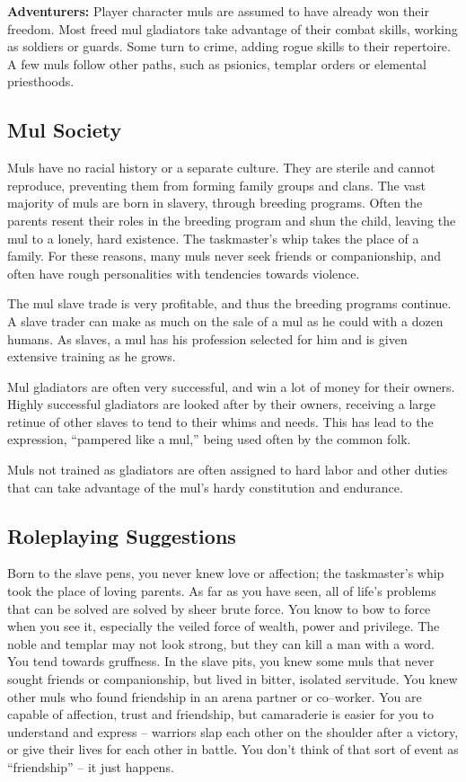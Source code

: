 \documentclass[10pt,a4paper,twocolumn]{d20}
\begin{document}
{\textbf{Adventurers:} Player character muls are assumed to have already won their freedom. Most freed mul gladiators take advantage of their combat skills, working as soldiers or guards. Some turn to crime, adding rogue skills to their repertoire. A few muls follow other paths, such as psionics, templar orders or elemental priesthoods.

\subsection{Mul Society}
Muls have no racial history or a separate culture. They are sterile and cannot reproduce, preventing them from forming family groups and clans. The vast majority of muls are born in slavery, through breeding programs. Often the parents resent their roles in the breeding program and shun the child, leaving the mul to a lonely, hard existence. The taskmaster’s whip takes the place of a family. For these reasons, many muls never seek friends or companionship, and often have rough personalities with tendencies towards violence.

The mul slave trade is very profitable, and thus the breeding programs continue. A slave trader can make as much on the sale of a mul as he could with a dozen humans. As slaves, a mul has his profession selected for him and is given extensive training as he grows.

Mul gladiators are often very successful, and win a lot of money for their owners. Highly successful gladiators are looked after by their owners, receiving a large retinue of other slaves to tend to their whims and needs. This has lead to the expression, ``pampered like a mul,'' being used often by the common folk.

Muls not trained as gladiators are often assigned to hard labor and other duties that can take advantage of the mul’s hardy constitution and endurance.

\subsection{Roleplaying Suggestions}
Born to the slave pens, you never knew love or affection; the taskmaster’s whip took the place of loving parents. As far as you have seen, all of life’s problems that can be solved are solved by sheer brute force. You know to bow to force when you see it, especially the veiled force of wealth, power and privilege. The noble and templar may not look strong, but they can kill a man with a word. You tend towards gruffness. In the slave pits, you knew some muls that never sought friends or companionship, but lived in bitter, isolated servitude. You knew other muls who found friendship in an arena partner or co–worker. You are capable of affection, trust and friendship, but camaraderie is easier for you to understand and express – warriors slap each other on the shoulder after a victory, or give their lives for each other in battle. You don’t think of that sort of event as ``friendship'' – it just happens.

}
\end{document}
